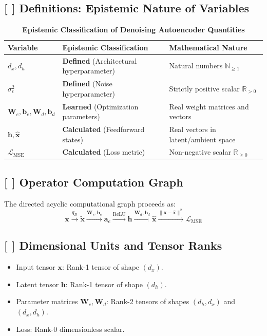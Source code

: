 \documentclass[11pt,a4paper]{article}
\theoremstyle{definition}
\begin{document}
\subsection{[ ] Definitions: Epistemic Nature of Variables}
\begin{table}[h]
\centering
\caption{\textbf{Epistemic Classification of Denoising Autoencoder Quantities}}
\begin{tabular}{lll}
\toprule
\textbf{Variable} & \textbf{Epistemic Classification} & \textbf{Mathematical Nature} \\
\midrule
$d_x, d_h$ & \textbf{Defined} (Architectural hyperparameter) & Natural numbers $\mathbb{N}_{\ge 1}$ \\
$\sigma_\epsilon^2$ & \textbf{Defined} (Noise hyperparameter) & Strictly positive scalar $\mathbb{R}_{> 0}$ \\
$\mathbf{W}_e, \mathbf{b}_e, \mathbf{W}_d, \mathbf{b}_d$ & \textbf{Learned} (Optimization parameters) & Real weight matrices and vectors \\
$\mathbf{h}, \hat{\mathbf{x}}$ & \textbf{Calculated} (Feedforward states) & Real vectors in latent/ambient space \\
$\mathcal{L}_{\text{MSE}}$ & \textbf{Calculated} (Loss metric) & Non-negative scalar $\mathbb{R}_{\ge 0}$ \\
\bottomrule
\end{tabular}
\end{table}

\subsection{[ ] Operator Computation Graph}
The directed acyclic computational graph proceeds as:
{\boldmath
\begin{equation}
\mathbf{x} \xrightarrow{q_D} \tilde{\mathbf{x}} \xrightarrow{\mathbf{W}_e, \mathbf{b}_e} \mathbf{a}_e \xrightarrow{\operatorname{ReLU}} \mathbf{h} \xrightarrow{\mathbf{W}_d, \mathbf{b}_d} \hat{\mathbf{x}} \xrightarrow{\|\mathbf{x} - \hat{\mathbf{x}}\|^2} \mathcal{L}_{\text{MSE}}
\end{equation}
}

\subsection{[ ] Dimensional Units and Tensor Ranks}
\begin{itemize}
    \item Input tensor $\mathbf{x}$: Rank-1 tensor of shape $(d_x)$.
    \item Latent tensor $\mathbf{h}$: Rank-1 tensor of shape $(d_h)$.
    \item Parameter matrices $\mathbf{W}_e, \mathbf{W}_d$: Rank-2 tensors of shapes $(d_h, d_x)$ and $(d_x, d_h)$.
    \item Loss: Rank-0 dimensionless scalar.
\end{itemize}
\end{document}
